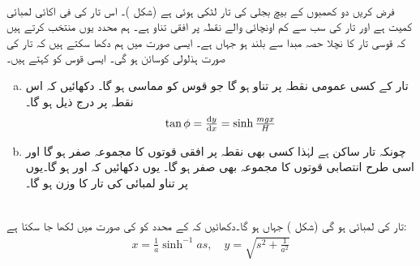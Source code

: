 \\
فرض کریں دو کھمبوں کے بیچ بجلی کی تار لٹکی ہوئی ہے (شکل )۔ اس تار کی فی اکائی لمبائی کمیت  ہے اور تار کی سب سے کم اونچائی والے نقطہ پر افقی تناو  ہے۔ ہم محدد یوں منتخب کرتے ہیں کہ قوسی تار کا نچلا حصہ مبدا سے  بلند ہو جہاں  ہے۔ ایسی صورت میں ہم دکھا سکتے ہیں کہ تار کی صورت ہذلولی کوسائن  ہو گی۔ ایسی قوس کو  کہتے ہیں۔
\begin{enumerate}[a.]
\item
تار کے کسی  عمومی نقطہ  پر تناو  ہو گا جو قوس کو مماسی ہو گا۔ دکھائیں کہ اس نقطہ پر درج ذیل ہو گا۔
\begin{align*}
\tan\phi=\tfrac{\dif y}{\dif x}=\sinh \tfrac{mgx}{H}
\end{align*}
\item
چونکہ تار ساکن ہے لہٰذا کسی بھی نقطہ پر افقی قوتوں کا مجموعہ صفر ہو گا اور اسی طرح انتصابی قوتوں کا مجموعہ بھی صفر ہو گا۔ یوں دکھائیں کہ  اور  ہو گا۔یوں  پر تناو  لمبائی کی تار کا وزن ہو گا۔ 
\end{enumerate}
\\
تار کی لمبائی  ہو گی  (شکل ) جہاں  ہو گا۔دکھائیں کہ  کے محدد کو  کی صورت میں لکھا جا سکتا ہے:
\begin{align*}
x=\frac{1}{a}\sinh^{-1}as,\quad y=\sqrt{s^2+\frac{1}{a^2}}
\end{align*}
